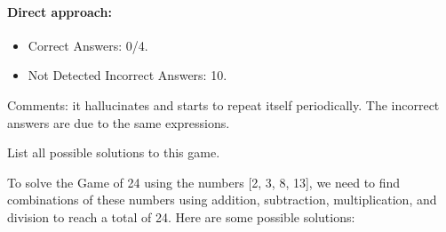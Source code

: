 \paragraph{Direct approach:}
\begin{itemize}
    \item Correct Answers: 0/4.
    \item Not Detected Incorrect Answers: 10.
\end{itemize}
Comments: it hallucinates and starts to repeat itself periodically. The incorrect answers are due to the same expressions.

\begin{dialogue}
  \begin{small}\begin{spverbatim}List all possible solutions to this game. \end{spverbatim}\end{small}
 \begin{small}\begin{spverbatim}
To solve the Game of 24 using the numbers [2, 3, 8, 13], we need to find combinations of these numbers using addition, subtraction, multiplication, and division to reach a total of 24. Here are some possible solutions:


\end{spverbatim}
\end{small}
\end{dialogue}
